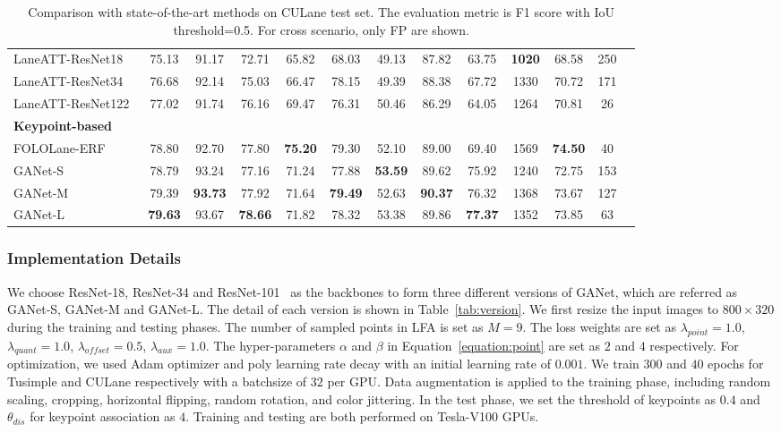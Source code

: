 \documentclass[10pt,twocolumn,letterpaper]{article}
\begin{document}
\begin{table*}[t]
\begin{center}
{\begin{tabular}{lcccccccccccc}
            LaneATT-ResNet18~\cite{Tabelini_2021_CVPR} & 75.13 & 91.17 & 72.71 & 65.82 & 68.03 & 49.13 & 87.82 & 63.75 & \textbf{1020} & 68.58 & 250 \\
            LaneATT-ResNet34~\cite{Tabelini_2021_CVPR} & 76.68 & 92.14 & 75.03 & 66.47 & 78.15 & 49.39 & 88.38 & 67.72 & 1330 & 70.72 & 171 \\
            LaneATT-ResNet122~\cite{Tabelini_2021_CVPR} & 77.02 & 91.74 & 76.16 & 69.47 & 76.31 & 50.46 & 86.29 & 64.05 & 1264 & 70.81 & 26 \\    \hline
            \textbf{Keypoint-based} \\ \hline
            FOLOLane-ERF~\cite{Qu_2021_CVPR} & 78.80 & 92.70 & 77.80 & \textbf{75.20} & 79.30 & 52.10 & 89.00 & 69.40 & 1569 & \textbf{74.50} & 40 \\  
            \rowcolor{mygray}
            GANet-S           & 78.79 & 93.24 & 77.16 & 71.24 & 77.88 & \textbf{53.59}  & 89.62 & 75.92 & 1240 & 72.75 & 153 \\
            \rowcolor{mygray}
            GANet-M           & 79.39 & \textbf{93.73} & 77.92 & 71.64 &  \textbf{79.49} & 52.63 & \textbf{90.37} & 76.32  &  1368 & 73.67 & 127 \\
            \rowcolor{mygray}
            GANet-L           & \textbf{79.63} &  93.67 & \textbf{78.66} & 71.82 & 78.32 & 53.38  & 89.86 & \textbf{77.37} & 1352 & 73.85 & 63 \\  \hline
        \end{tabular}
    }
    \caption{Comparison with state-of-the-art methods on CULane test set. The evaluation metric is F1 score with IoU threshold=0.5. For cross scenario, only FP are shown.}
    \label{tab:culane}
    \end{center}
\end{table*}

\subsubsection{Implementation Details}
We choose ResNet-18, ResNet-34 and ResNet-101~\cite{He_2016_CVPR} as the backbones to form three different versions of GANet, which are referred as GANet-S, GANet-M and GANet-L. The detail of each version is shown in Table~\ref{tab:version}.
We first resize the input images to $800\times 320$ during the training and testing phases. The number of sampled points in LFA is set as $M=9$. The loss weights are set as $\lambda_{point}=1.0$, $\lambda_{quant}=1.0$, $\lambda_{offset}=0.5$, $\lambda_{aux}=1.0$. 
The hyper-parameters $\alpha$ and $\beta$ in Equation~\ref{equation:point} are set as $2$ and $4$ respectively. 
For optimization, we used Adam optimizer and poly learning rate decay with an initial learning rate of $0.001$. We train $300$ and $40$ epochs for Tusimple and CULane respectively with a batchsize of $32$ per GPU. Data augmentation is applied to the training phase, including random scaling, cropping, horizontal flipping, random rotation, and color jittering. In the test phase, we set the threshold of keypoints as $0.4$ and $\theta_{dis}$ for keypoint association as $4$. Training and testing are both performed on Tesla-V100 GPUs.
\end{document}
